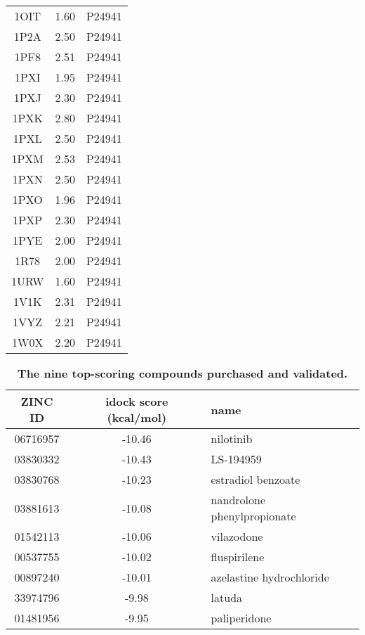\documentclass[10pt]{article}
\begin{document}
\begin{table}[!ht]
\begin{tabular}{ccc}
1OIT & 1.60 & P24941\\
1P2A & 2.50 & P24941\\
1PF8 & 2.51 & P24941\\
1PXI & 1.95 & P24941\\
1PXJ & 2.30 & P24941\\
1PXK & 2.80 & P24941\\
1PXL & 2.50 & P24941\\
1PXM & 2.53 & P24941\\
1PXN & 2.50 & P24941\\
1PXO & 1.96 & P24941\\
1PXP & 2.30 & P24941\\
1PYE & 2.00 & P24941\\
1R78 & 2.00 & P24941\\
1URW & 1.60 & P24941\\
1V1K & 2.31 & P24941\\
1VYZ & 2.21 & P24941\\
1W0X & 2.20 & P24941\\
\end{tabular}
\begin{flushleft}\label{PDBs}
\end{flushleft}
\end{table}

\begin{table}[!ht]
\caption{
\bf{The nine top-scoring compounds purchased and validated.}}
\begin{tabular}{ccl}
\hline
ZINC ID & idock score (kcal/mol) & name\\
\hline
06716957 & -10.46 & nilotinib\\
03830332 & -10.43 & LS-194959\\
03830768 & -10.23 & estradiol benzoate\\
03881613 & -10.08 & nandrolone phenylpropionate\\
01542113 & -10.06 & vilazodone\\
00537755 & -10.02 & fluspirilene\\
00897240 & -10.01 & azelastine hydrochloride\\
33974796 &  -9.98 & latuda\\
01481956 &  -9.95 & paliperidone\\
\hline
\end{tabular}
\begin{flushleft}\label{Top9}
\end{flushleft}
\end{table}

\end{document}

